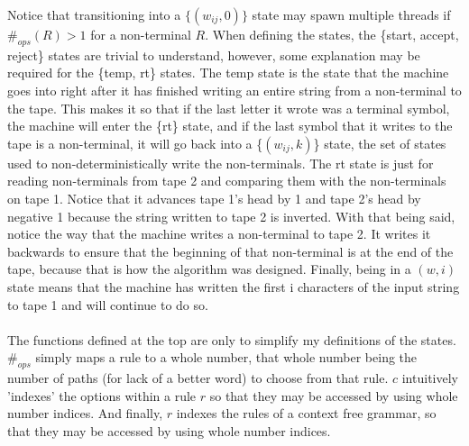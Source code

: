\documentclass[11pt]{article}
\begin{document}
Notice that transitioning into a $\{(w_{ij},0)\}$ state may spawn multiple threads if $\#_{ops}(R)>1$ for a non-terminal $R$.
\clearpage
When defining the states, the \{start, accept, reject\} states are trivial to understand, however, some explanation may be required for the \{temp, rt\} states. The temp state is the state that the machine goes into right after it has finished writing an entire string from a non-terminal to the tape. This makes it so that if the last letter it wrote was a terminal symbol, the machine will enter the \{rt\} state, and if the last symbol that it writes to the tape is a non-terminal, it will go back into a \{$(w_{ij},k)$\} state, the set of states used to non-deterministically write the non-terminals. The rt state is just for reading non-terminals from tape 2 and comparing them with the non-terminals on tape 1. Notice that it advances tape 1's head by 1 and tape 2's head by negative 1 because the string written to tape 2 is inverted. With that being said, notice the way that the machine writes a non-terminal to tape 2. It writes it backwards to ensure that the beginning of that non-terminal is at the end of the tape, because that is how the algorithm was designed. Finally, being in a $(w,i)$ state means that the machine has written the first i characters of the input string to tape 1 and will continue to do so. \\ \\
The functions defined at the top are only to simplify my definitions of the states. $\#_{ops}$ simply maps a rule to a whole number, that whole number being the number of paths (for lack of a better word) to choose from that rule. $c$ intuitively 'indexes' the options within a rule $r$ so that they may be accessed by using whole number indices. And finally, $r$ indexes the rules of a context free grammar, so that they may be accessed by using whole number indices.
\end{document}
